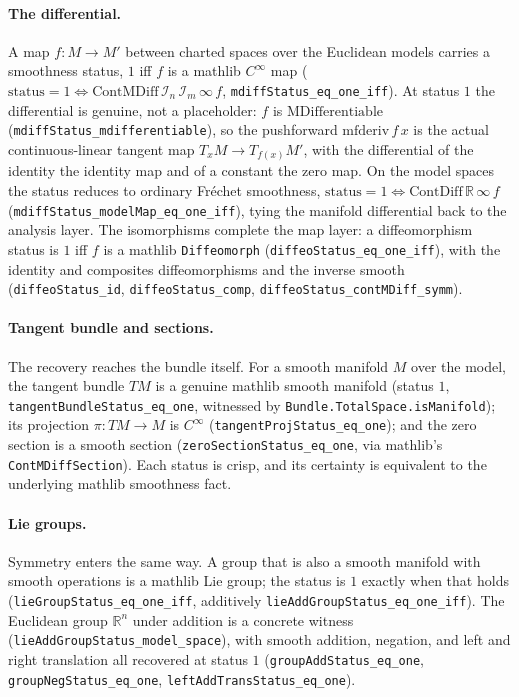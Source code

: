 \documentclass[11pt,a4paper]{article}
\newcommand{\Lean}[1]{\texttt{#1}}
\begin{document}
\paragraph{The differential.}
A map $f:M\to M'$ between charted spaces over the Euclidean models
carries a smoothness status, $1$ iff $f$ is a mathlib $C^\infty$ map
($\mathrm{status}=1\iff\mathrm{ContMDiff}\,\mathcal I_n\,\mathcal I_m\,\infty\,f$,
\Lean{mdiffStatus\_eq\_one\_iff}).  At status $1$ the differential is
genuine, not a placeholder: $f$ is $\mathrm{MDifferentiable}$
(\Lean{mdiffStatus\_mdifferentiable}), so the pushforward
$\mathrm{mfderiv}\,f\,x$ is the actual continuous-linear tangent map
$T_xM\to T_{f(x)}M'$, with the differential of the identity the identity
map and of a constant the zero map.  On the model spaces the status
reduces to ordinary Fr\'echet smoothness,
$\mathrm{status}=1\iff\mathrm{ContDiff}\,\mathbb R\,\infty\,f$
(\Lean{mdiffStatus\_modelMap\_eq\_one\_iff}), tying the manifold
differential back to the analysis layer.  The isomorphisms complete the
map layer: a diffeomorphism status is $1$ iff $f$ is a mathlib
\texttt{Diffeomorph} (\Lean{diffeoStatus\_eq\_one\_iff}), with the
identity and composites diffeomorphisms and the inverse smooth
(\Lean{diffeoStatus\_id}, \Lean{diffeoStatus\_comp},
\Lean{diffeoStatus\_contMDiff\_symm}).

\paragraph{Tangent bundle and sections.}
The recovery reaches the bundle itself.  For a smooth manifold $M$ over
the model, the tangent bundle $TM$ is a genuine mathlib smooth manifold
(status $1$, \Lean{tangentBundleStatus\_eq\_one}, witnessed by
\texttt{Bundle.TotalSpace.isManifold}); its projection $\pi:TM\to M$ is
$C^\infty$ (\Lean{tangentProjStatus\_eq\_one}); and the zero section is a
smooth section (\Lean{zeroSectionStatus\_eq\_one}, via mathlib's
\texttt{ContMDiffSection}).  Each status is crisp, and its certainty is
equivalent to the underlying mathlib smoothness fact.

\paragraph{Lie groups.}
Symmetry enters the same way.  A group that is also a smooth manifold
with smooth operations is a mathlib Lie group; the status is $1$ exactly
when that holds (\Lean{lieGroupStatus\_eq\_one\_iff}, additively
\Lean{lieAddGroupStatus\_eq\_one\_iff}).  The Euclidean group
$\mathbb{R}^n$ under addition is a concrete witness
(\Lean{lieAddGroupStatus\_model\_space}), with smooth addition,
negation, and left and right translation all recovered at status $1$
(\Lean{groupAddStatus\_eq\_one}, \Lean{groupNegStatus\_eq\_one},
\Lean{leftAddTransStatus\_eq\_one}).
\end{document}

